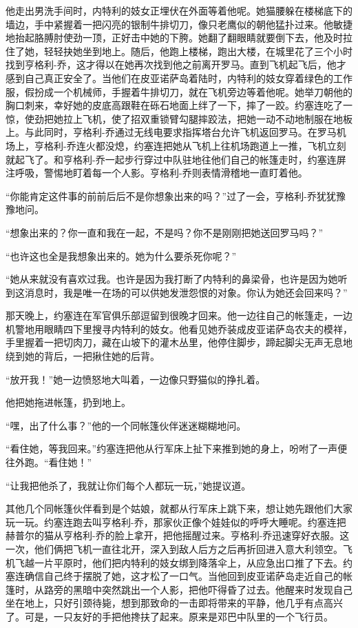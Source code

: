     他走出男洗手间时，内特利的妓女正埋伏在外面等着他呢。她猫腰躲在楼梯底下的墙边，手中紧握着一把闪亮的银制牛排切刀，像只老鹰似的朝他猛扑过来。他敏捷地抬起胳膊肘使劲一顶，正好击中她的下胯。她翻了翻眼睛就要倒下去，他及时拉住了她，轻轻抉她坐到地上。随后，他跑上楼梯，跑出大楼，在城里花了三个小时找到亨格利-乔，这才得以在她再次找到他之前离开罗马。直到飞机起飞后，他才感到自己真正安全了。当他们在皮亚诺萨岛着陆时，内特利的妓女穿着绿色的工作服，假扮成一个机械师，手握着牛排切刀，就在飞机旁边等着他呢。她举刀朝他的胸口刺来，幸好她的皮底高跟鞋在砾石地面上绊了一下，摔了一跤。约塞连吃了一惊，使劲把她拉上飞机，使了招双重锁臂勾腿摔跤法，把她一动不动地制服在地板上。与此同时，亨格利-乔通过无线电要求指挥塔台允许飞机返回罗马。在罗马机场上，亨格利-乔连火都没熄，约塞连把她从飞机上往机场跑道上一推，飞机立刻就起飞了。和亨格利-乔一起步行穿过中队驻地往他们自己的帐篷走时，约塞连屏注呼吸，警惕地盯着每一个人影。亨格利-乔则表情滑稽地一直盯着他。

    “你能肯定这件事的前前后后不是你想象出来的吗？”过了一会，亨格利-乔犹犹豫豫地问。

    “想象出来的？你一直和我在一起，不是吗？你不是刚刚把她送回罗马吗？”

    “也许这也全是我想象出来的。她为什么要杀死你呢？”

    “她从来就没有喜欢过我。也许是因为我打断了内特利的鼻梁骨，也许是因为她听到这消息时，我是唯一在场的可以供她发泄怨恨的对象。你认为她还会回来吗？”

    那天晚上，约塞连在军官俱乐部逗留到很晚才回来。他一边往自己的帐篷走，一边机警地用眼睛四下里搜寻内特利的妓女。他看见她乔装成皮亚诺萨岛农夫的模祥，手里握着一把切肉刀，藏在山坡下的灌木丛里，他停住脚步，蹄起脚尖无声无息地绕到她的背后，一把揪住她的后背。

    “放开我！”她一边愤怒地大叫着，一边像只野猫似的挣扎着。

    他把她拖进帐篷，扔到地上。

    “嘿，出了什么事？”他的一个同帐篷伙伴迷迷糊糊地问。

    “看住她，等我回来。”约塞连把他从行军床上扯下来推到她的身上，吩咐了一声便往外跑。“看住她！”

    “让我把他杀了，我就让你们每个人都玩一玩，”她提议道。

    其他几个同帐篷伙伴看到是个姑娘，就都从行军床上跳下来，想让她先跟他们大家玩一玩。约塞连跑去叫亨格利-乔，那家伙正像个娃娃似的呼呼大睡呢。约塞连把赫普尔的猫从亨格利-乔的脸上拿开，把他摇醒过来。亨格利-乔迅速穿好衣服。这一次，他们俩把飞机一直往北开，深入到敌人后方之后再折回进入意大利领空。飞机飞越一片平原时，他们把内特利的妓女绑到降落伞上，从应急出口推了下去。约塞连确信自己终于摆脱了她，这才松了一口气。当他回到皮亚诺萨岛走近自己的帐篷时，从路旁的黑暗中突然跳出一个人影，把他吓得昏了过去。他醒来时发现自己坐在地上，只好引颈待毙，想到那致命的一击即将带来的平静，他几乎有点高兴了。可是，一只友好的手把他搀扶了起来。原来是邓巴中队里的一个飞行员。

